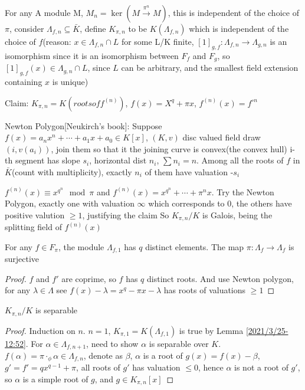 \documentclass[main]{subfiles}
\begin{document}
\begin{definition}
For any A module M, $M_n=\ker(M\xrightarrow{\pi^n}M)$, this is independent of the choice of $\pi$, consider $\Lambda_{f,n}\subseteq \bar K$, define $K_{\pi,n}$ to be $K(\Lambda_{f,n})$ which is independent of the choice of $f$(reason: $x\in \Lambda_{f,n}\cap L$ for some L/K finite, $[1]_{g,f}:\Lambda_{f,n}\to\Lambda_{g,n}$ is an isomorphism since it is an isomorphism between $F_f$ and $F_g$, so $[1]_{g,f}(x)\in\Lambda_{g,n}\cap L$, since $L$ can be arbitrary, and the smallest field extension containing $x$ is unique)
\end{definition}

Claim: $K_{\pi,n}=K(roots of f^{(n)})$, $f(x)=X^q+\pi x$, $f^{(n)}(x)=f^{\circ n}$

Newton Polygon[Neukirch's book]: Suppose $f(x)=a_nx^n+\cdots+a_1x+a_0\in K[x]$, $(K,v)$ disc valued field
draw $(i,v(a_i))$, join them so that it the joining curve is convex(the convex hull)
i-th segment has slope $s_i$, horizontal dist $n_i$, $\sum n_i=n$. Among all the roots of $f$ in $\bar K$(count with multiplicity), exactly $n_i$ of them have valuation -$s_i$

$f^{(n)}(x)\equiv x^{q^n}\mod\pi$ and $f^{(n)}(x)=x^{q^n}+\cdots+\pi^n x$. Try the Newton Polygon, exactly one with valuation $
\infty$ which corresponds to 0, the others have positive valution $\geq1$, justifying the claim
So $K_{\pi,n}/K$ is Galois, being the splitting field of $f^{(n)}(x)$

\begin{lemma}\label{2021/3/25-12:52}
For any $f\in F_\pi$, the module $\Lambda_{f,1}$ has $q$ distinct elements. The map $\pi:\Lambda_{f}\to\Lambda_{f}$ is surjective
\end{lemma}

\begin{proof}
$f$ and $f'$ are coprime, so $f$ has $q$ distinct roots. And use Newton polygon, for any $\lambda\in\Lambda$ see $f(x)-\lambda=x^q-\pi x-\lambda$ has roots of valuations $\geq1$
\end{proof}

\begin{lemma}
$K_{\pi,n}/K$ is separable
\end{lemma}

\begin{proof}
Induction on $n$. $n=1$, $K_{\pi,1}=K(\Lambda_{f,1})$ is true by Lemma \ref{2021/3/25-12:52}. For $\alpha\in\Lambda_{f,n+1}$, need to show $\alpha$ is separable over $K$. $f(\alpha)=\pi\cdot_\phi\alpha\in\Lambda_{f,n}$, denote as $\beta$, $\alpha$ is a root of $g(x)=f(x)-\beta$, $g'=f'=qx^{q-1}+\pi$, all roots of $g'$ has valuation $\leq0$, hence $\alpha$ is not a root of $g'$, so $\alpha$ is a simple root of $g$, and $g\in K_{\pi,n}[x]$
\end{proof}
\end{document}
